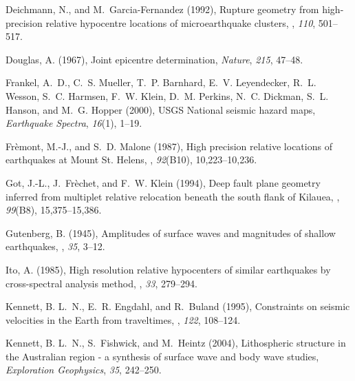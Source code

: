 \documentclass[12pt,double]{article}
\begin{document}
\begin{thebibliography}{45}
Deichmann, N., and M.~Garcia-{F}ernandez (1992), Rupture geometry from
  high-precision relative hypocentre locations of microearthquake clusters,
  \gji, \textit{110}, 501--517.

Douglas, A. (1967), Joint epicentre determination, \textit{Nature},
  \textit{215}, 47--48.

Frankel, A.~D., C.~S. Mueller, T.~P. Barnhard, E.~V. Leyendecker, R.~L. Wesson,
  S.~C. Harmsen, F.~W. Klein, D.~M. Perkins, N.~C. Dickman, S.~L. Hanson, and
  M.~G. Hopper (2000), {USGS} {N}ational seismic hazard maps,
  \textit{Earthquake Spectra}, \textit{16}(1), 1--19.

Fr\`emont, M.-J., and S.~D. Malone (1987), High precision relative locations of
  earthquakes at {M}ount {St.} {H}elens, \jgr, \textit{92}(B10), 10,223--10,236.

Got, J.-L., J.~Fr\`echet, and F.~W. Klein (1994), Deep fault plane geometry
  inferred from multiplet relative relocation beneath the south flank of
  {K}ilauea, \jgr, \textit{99}(B8),
  15,375--15,386.

Gutenberg, B. (1945), Amplitudes of surface waves and magnitudes of shallow
  earthquakes, \bssa,
  \textit{35}, 3--12.

Ito, A. (1985), High resolution relative hypocenters of similar earthquakes by
  cross-spectral analysis method, \jpe,
  \textit{33}, 279--294.

Kennett, B. L.~N., E.~R. Engdahl, and R.~Buland (1995), Constraints on seismic
  velocities in the {E}arth from traveltimes, \gji, \textit{122}, 108--124.

Kennett, B. L.~N., S.~Fishwick, and M.~Heintz (2004), Lithospheric structure in
  the {A}ustralian region - a synthesis of surface wave and body wave studies,
  \textit{Exploration Geophysics}, \textit{35}, 242--250.


\end{thebibliography}
\end{document}
